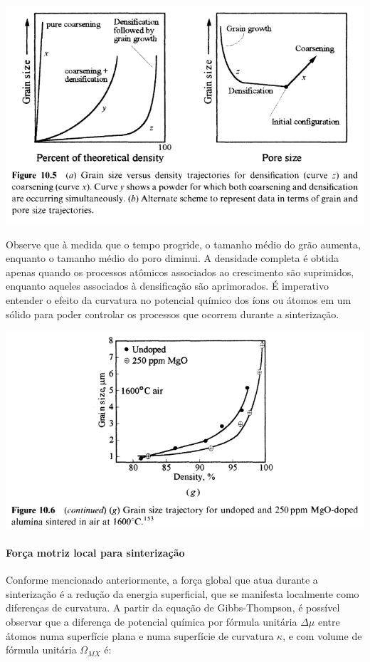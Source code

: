 \includegraphics*[width=\linewidth]{./images/tamanho_grao_densidade.png}

Observe que à medida que o tempo progride, o tamanho médio do grão aumenta, enquanto o tamanho médio do poro diminui. A densidade completa é obtida apenas quando os processos atômicos associados ao crescimento são suprimidos, enquanto aqueles associados à densificação são aprimorados. É imperativo entender o efeito da curvatura no potencial químico dos íons ou átomos em um sólido para poder controlar os processos que ocorrem durante a sinterização.

\includegraphics*[width=\linewidth]{./images/trajetoria_grao_densidade.png}

\paragraph*{Força motriz local para sinterização}

Conforme mencionado anteriormente, a força global que atua durante a sinterização é a redução da energia superficial, que se manifesta localmente como diferenças de curvatura. A partir da equação de Gibbs-Thompson, é possível observar que a diferença de potencial química por fórmula unitária $\Delta\mu$ entre átomos numa superfície plana e numa superfície de curvatura $\kappa$, e com volume de fórmula unitária $\Omega_{MX}$ é:

